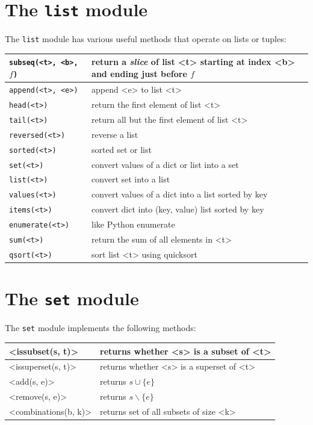 \documentclass{report}
\begin{document}
\section{The \texttt{list} module}
\label{ap:list}

%
The \texttt{list} module has various useful methods that operate on lists
or tuples:

\vspace{1em}
\begin{tabular}{|l|l|}
\hline
\texttt{subseq(<{t}>, <{b}>, $f$)} & return a \emph{slice} of list <{t}> starting
at index <{b}> and ending just before $f$\\
\hline
\texttt{append(<{t}>, <{e}>)} & append <{e}> to list <{t}>\\
\hline
\texttt{head(<{t}>)} & return the first element of list <{t}>\\
\hline
\texttt{tail(<{t}>)} & return all but the first element of list <{t}>\\
\hline
\texttt{reversed(<{t}>)} & reverse a list \\
\hline
\texttt{sorted(<{t}>)} & sorted set or list \\
\hline
\texttt{set(<{t}>)} & convert values of a dict or list into a set \\
\hline
\texttt{list(<{t}>)} & convert set into a list \\
\hline
\texttt{values(<{t}>)} & convert values of a dict into a list sorted by key \\
\hline
\texttt{items(<{t}>)} & convert dict into (key, value) list sorted by key \\
\hline
\texttt{enumerate(<{t}>)} & like Python enumerate \\
\hline
\texttt{sum(<{t}>)} & return the sum of all elements in <{t}>\\
\hline
\texttt{qsort(<{t}>)} & sort list <{t}> using quicksort\\
\hline
\end{tabular}

\section{The \texttt{set} module}
\label{ap:set}

The \texttt{set} module
%
implements the following methods:

\vspace{1em}
\begin{tabular}{|l|l|}
\hline
<{issubset(s, t)}> & returns whether <{s}> is a subset of <{t}> \\
\hline
<{issuperset(s, t)}> & returns whether <{s}> is a superset of <{t}> \\
\hline
<{add(s, e)}> & returns $s \cup \{ e \}$ \\
\hline
<{remove(s, e)}> & returns $s \backslash \{ e \}$ \\
\hline
<{combinations(b, k)}> & returns set of all subsets of size <{k}> \\
\hline
\end{tabular}
\end{document}
